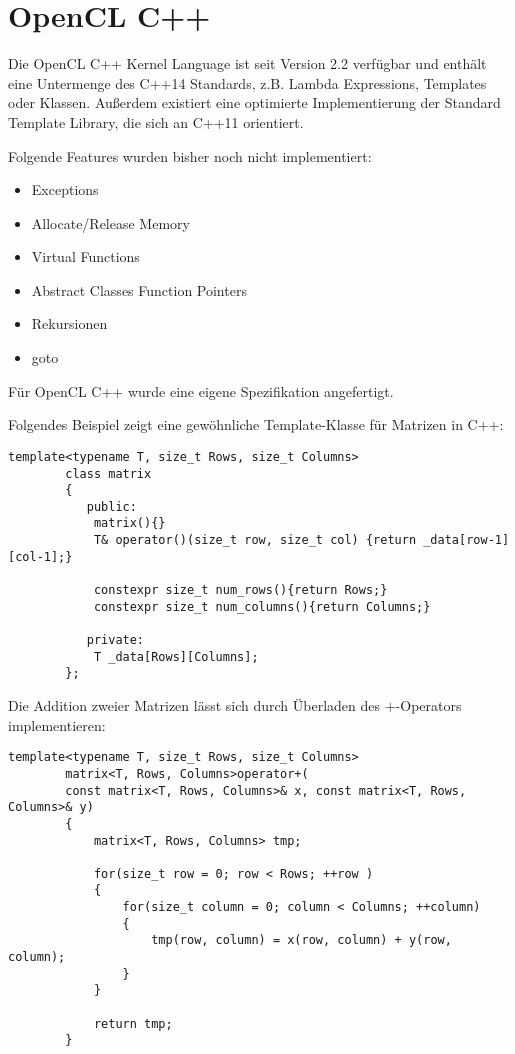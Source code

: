 		
		\section{OpenCL C++}\label{OCLC++}
		Die OpenCL C++ \Gls{Kernel} Language ist seit Version 2.2 verfügbar und enthält eine Untermenge des C++14 Standards, z.B. Lambda Expressions, Templates oder Klassen. Außerdem existiert eine optimierte Implementierung der Standard Template Library, die sich an C++11 orientiert. 
		
		Folgende Features wurden bisher noch nicht implementiert:
		\begin{itemize}
			\item Exceptions
			\item Allocate/Release Memory
			\item Virtual Functions 
			\item Abstract Classes Function Pointers
			\item Rekursionen 
			\item goto
		\end{itemize}
		
		Für OpenCL C++ wurde eine eigene Spezifikation angefertigt. \autocite{oclC++Spec}
		
		Folgendes Beispiel zeigt eine gewöhnliche Template-Klasse für Matrizen in C++:
		\begin{lstlisting}[caption=Matrix OpenCl C++]
		template<typename T, size_t Rows, size_t Columns>
		class matrix 
		{
		   public:
			matrix(){}
			T& operator()(size_t row, size_t col) {return _data[row-1][col-1];}

			constexpr size_t num_rows(){return Rows;}
			constexpr size_t num_columns(){return Columns;}
			
		   private:
			T _data[Rows][Columns];
		};
		\end{lstlisting}
		
		Die Addition zweier Matrizen lässt sich durch Überladen des $+$-Operators implementieren:
		\begin{lstlisting}[caption=Matrixaddition OpenCl C++]
		template<typename T, size_t Rows, size_t Columns> 
		matrix<T, Rows, Columns>operator+(
		const matrix<T, Rows, Columns>& x, const matrix<T, Rows, Columns>& y) 
		{
			matrix<T, Rows, Columns> tmp;
			
			for(size_t row = 0; row < Rows; ++row ) 
			{
				for(size_t column = 0; column < Columns; ++column) 
				{
					tmp(row, column) = x(row, column) + y(row, column);
				}
			}
			
			return tmp;
		}
		\end{lstlisting}
		

